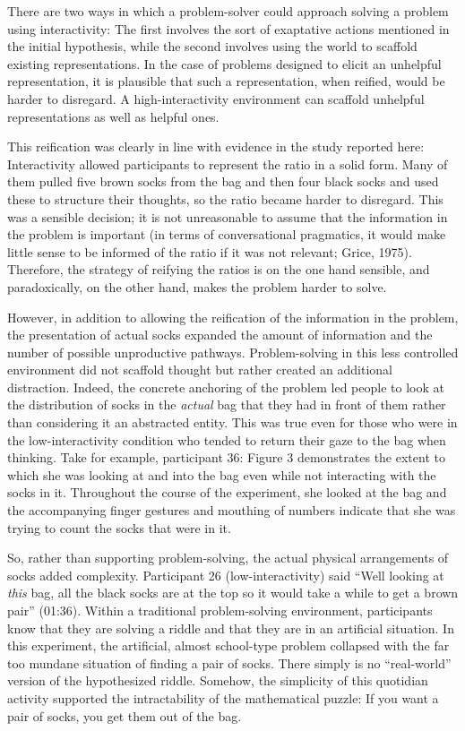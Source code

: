 There are two ways in which a problem-solver could approach solving a
problem using interactivity: The first involves the sort of exaptative
actions mentioned in the initial hypothesis, while the second involves
using the world to scaffold existing representations. In the case of
problems designed to elicit an unhelpful representation, it is plausible
that such a representation, when reified, would be harder to disregard.
A high-interactivity environment can scaffold unhelpful representations
as well as helpful ones.

This reification was clearly in line with evidence in the study reported
here: Interactivity allowed participants to represent the ratio in a
solid form. Many of them pulled five brown socks from the bag and then
four black socks and used these to structure their thoughts, so the
ratio became harder to disregard. This was a sensible decision; it is
not unreasonable to assume that the information in the problem is
important (in terms of conversational pragmatics, it would make little
sense to be informed of the ratio if it was not relevant; Grice, 1975).
Therefore, the strategy of reifying the ratios is on the one hand
sensible, and paradoxically, on the other hand, makes the problem harder
to solve.

However, in addition to allowing the reification of the information in
the problem, the presentation of actual socks expanded the amount of
information and the number of possible unproductive pathways.
Problem-solving in this less controlled environment did not scaffold
thought but rather created an additional distraction. Indeed, the
concrete anchoring of the problem led people to look at the distribution
of socks in the \emph{actual} bag that they had in front of them rather
than considering it an abstracted entity. This was true even for those
who were in the low-interactivity condition who tended to return their
gaze to the bag when thinking. Take for example, participant 36: Figure
3 demonstrates the extent to which she was looking at and into the bag
even while not interacting with the socks in it. Throughout the course
of the experiment, she looked at the bag and the accompanying finger
gestures and mouthing of numbers indicate that she was trying to count
the socks that were in it.

So, rather than supporting problem-solving, the actual physical
arrangements of socks added complexity. Participant 26
(low-interactivity) said ``Well looking at \emph{this} bag, all the
black socks are at the top so it would take a while to get a brown
pair'' (01:36). Within a traditional problem-solving environment,
participants know that they are solving a riddle and that they are in an
artificial situation. In this experiment, the artificial, almost
school-type problem collapsed with the far too mundane situation of
finding a pair of socks. There simply is no ``real-world'' version of
the hypothesized riddle. Somehow, the simplicity of this quotidian
activity supported the intractability of the mathematical puzzle: If you
want a pair of socks, you get them out of the bag.

